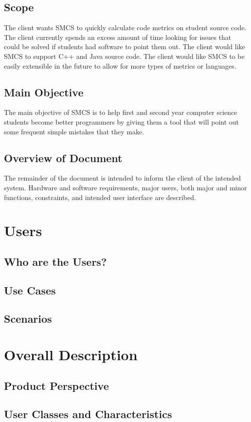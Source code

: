 \documentclass{scrreprt}
\begin{document}
	\section{Scope}
	The client wants SMCS to quickly calculate code metrics on student source code. The client currently spends an excess amount of time looking for issues that could be solved if students had software to point them out. The client would like SMCS to support C++ and Java source code. The client would like SMCS to be easily extensible in the future to allow for more types of metrics or languages.
	\section{Main Objective}
	The main objective of SMCS is to help first and second year computer science students become better programmers by giving them a tool that will point out some frequent simple mistakes that they make.
	\section{Overview of Document}
	The remainder of the document is intended to inform the client of the intended system. Hardware and software requirements, major users, both major and minor functions, constraints, and intended user interface are described.
	\chapter{Users}
	\section{Who are the Users?}
	\section{Use Cases}
	\section{Scenarios}
	\chapter{Overall Description}
	\section{Product Perspective}
	\section{User Classes and Characteristics}
\end{document}
